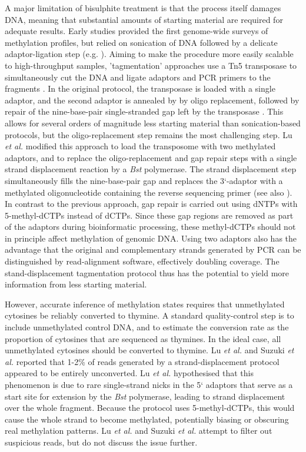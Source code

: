 \documentclass[10pt,letterpaper]{article}
\begin{document}
A major limitation of bisulphite treatment is that the process itself damages DNA, meaning that substantial amounts of starting material are required for adequate results.
Early studies provided the first genome-wide surveys of methylation profiles, but relied on sonication of DNA followed by a delicate adaptor-ligation step (e.g. \cite{meissner2005reduced, cokus2008shotgun, lister2009human}).
Aiming to make the procedure more easily scalable to high-throughput samples, 'tagmentation' approaches use a Tn5 transposase to simultaneously cut the DNA and ligate adaptors and PCR primers to the fragments \cite{wang2013tagmentation}.
In the original protocol, the transposase is loaded with a single adaptor, and the second adaptor is annealed by by oligo replacement, followed by repair of the nine-base-pair single-stranded gap left by the transposase \cite{adey2012ultra}.
This allows for several orders of magnitude less starting material than sonication-based protocols, but the oligo-replacement step remains the most challenging step.
Lu \textit{et al.} \cite{lu2015improved} modified this approach to load the transposome with two methylated adaptors, and to replace the oligo-replacement and gap repair steps with a single strand displacement reaction by a \textit{Bst} polymerase.
The strand displacement step simultaneously fills the nine-base-pair gap and replaces the 3`-adaptor with a methylated oligonucleotide containing the
reverse sequencing primer (see also \cite{weichenhan2019generation, suzuki2018whole}).
In contrast to the previous approach, gap repair is carried out using dNTPs with 5-methyl-dCTPs instead of dCTPs.
Since these gap regions are removed as part of the adaptors during bioinformatic processing, these methyl-dCTPs should not in principle affect methylation of genomic DNA.
Using two adaptors also has the advantage that the original and complementary strands generated by PCR can be distinguished by read-alignment software, effectively doubling coverage. 
The stand-displacement tagmentation protocol thus has the potential to yield more information from less starting material.

However, accurate inference of methylation states requires that unmethylated cytosines be reliably converted to thymine.
A standard quality-control step is to include unmethylated control DNA, and to estimate the conversion rate as the proportion of cytosines that are sequenced as thymines.
In the ideal case, all unmethylated cytosines should be converted to thymine.
Lu \textit{et al.} \cite{lu2015improved} and Suzuki \textit{et al.} \cite{suzuki2018whole} reported that 1-2\% of reads generated by a strand-displacement protocol appeared to be entirely unconverted.
Lu \textit{et al.} \cite{lu2015improved} hypothesised that this phenomenon is due to rare single-strand nicks in the 5` adaptors that serve as a start site for extension by the \textit{Bst} polymerase, leading to strand displacement over the whole fragment.
Because the protocol uses 5-methyl-dCTPs, this would cause the whole strand to become methylated, potentially biasing or obscuring real methylation patterns.
Lu \textit{et al.} \cite{lu2015improved} and Suzuki \textit{et al.} \cite{suzuki2018whole} attempt to filter out suspicious reads, but do not discuss the issue further.
\end{document}
